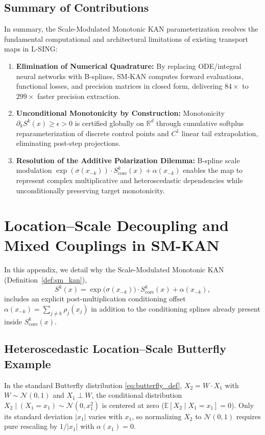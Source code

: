 \documentclass[11pt,a4paper]{article}
\theoremstyle{plain}
\theoremstyle{definition}
\theoremstyle{remark}
\begin{document}
\subsection{Summary of Contributions}
\label{subsec:summary_conclusions}

In summary, the Scale-Modulated Monotonic KAN parameterization resolves the fundamental computational and architectural limitations of existing transport maps in L-SING:
\begin{enumerate}
    \item \textbf{Elimination of Numerical Quadrature:} By replacing ODE/integral neural networks with B-splines, SM-KAN computes forward evaluations, functional losses, and precision matrices in closed form, delivering $84\times$ to $299\times$ faster precision extraction.
    \item \textbf{Unconditional Monotonicity by Construction:} Monotonicity $\partial_k S^k(x) \ge \epsilon > 0$ is certified globally on $\mathbb{R}^d$ through cumulative softplus reparameterization of discrete control points and $C^1$ linear tail extrapolation, eliminating post-step projections.
    \item \textbf{Resolution of the Additive Polarization Dilemma:} B-spline scale modulation $\exp(\sigma(x_{-k})) \cdot S^k_{\text{core}}(x) + \alpha(x_{-k})$ enables the map to represent complex multiplicative and heteroscedastic dependencies while unconditionally preserving target monotonicity.
\end{enumerate}
\appendix
\section{Location--Scale Decoupling and Mixed Couplings in SM-KAN}
\label{app:sm_kan_location_scale}

In this appendix, we detail why the Scale-Modulated Monotonic KAN (Definition~\ref{def:sm_kan}),
\begin{equation}
    S^k(x) = \exp\big(\sigma(x_{-k})\big) \cdot S^k_{\text{core}}(x) + \alpha(x_{-k}),
\end{equation}
includes an explicit post-multiplication conditioning offset $\alpha(x_{-k}) = \sum_{j \neq k} \rho_j(x_j)$ in addition to the conditioning splines already present inside $S^k_{\text{core}}(x)$.

\subsection{Heteroscedastic Location--Scale Butterfly Example}
In the standard Butterfly distribution \eqref{eq:butterfly_def}, $X_2 = W \cdot X_1$ with $W \sim \mathcal{N}(0, 1)$ and $X_1 \perp W$, the conditional distribution $X_2 \mid (X_1 = x_1) \sim \mathcal{N}(0, x_1^2)$ is centered at zero ($\mathbb{E}[X_2 \mid X_1 = x_1] = 0$). Only its standard deviation $|x_1|$ varies with $x_1$, so normalizing $X_2$ to $\mathcal{N}(0, 1)$ requires pure rescaling by $1/|x_1|$ with $\alpha(x_1) = 0$.
\end{document}
